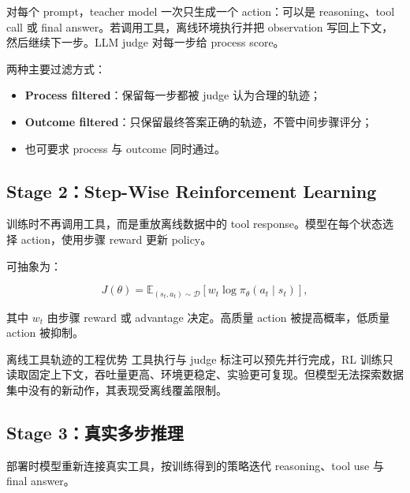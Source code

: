\documentclass[a4paper]{article}
\begin{document}
对每个 prompt，teacher model 一次只生成一个 action：可以是 reasoning、tool call 或 final answer。若调用工具，离线环境执行并把 observation 写回上下文，然后继续下一步。LLM judge 对每一步给 process score。


两种主要过滤方式：

\begin{itemize}
    \item \textbf{Process filtered}：保留每一步都被 judge 认为合理的轨迹；
    \item \textbf{Outcome filtered}：只保留最终答案正确的轨迹，不管中间步骤评分；
    \item 也可要求 process 与 outcome 同时通过。
\end{itemize}

\subsection{Stage 2：Step-Wise Reinforcement Learning}

训练时不再调用工具，而是重放离线数据中的 tool response。模型在每个状态选择 action，使用步骤 reward 更新 policy。



可抽象为：

$$
J(\theta)=\mathbb E_{(s_t,a_t)\sim\mathcal D}
\left[w_t\log\pi_\theta(a_t\mid s_t)\right],
$$

其中 $w_t$ 由步骤 reward 或 advantage 决定。高质量 action 被提高概率，低质量 action 被抑制。

\begin{knowledgebox}{离线工具轨迹的工程优势}
工具执行与 judge 标注可以预先并行完成，RL 训练只读取固定上下文，吞吐量更高、环境更稳定、实验更可复现。但模型无法探索数据集中没有的新动作，其表现受离线覆盖限制。
\end{knowledgebox}

\subsection{Stage 3：真实多步推理}

部署时模型重新连接真实工具，按训练得到的策略迭代 reasoning、tool use 与 final answer。
\end{document}
